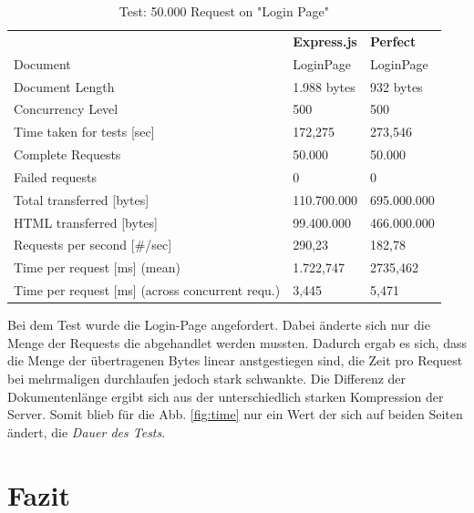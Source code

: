 \begin{table}[H]
\begin{center}
\begin{tabular}{p{8cm}p{2.5cm}p{2.5cm}}
\rowcolor{gray20}														& \textbf{Express.js}	  		& \textbf{Perfect}		\\ 
\rowcolor{gray5}		Document 											& LoginPage					& LoginPage			\\ 
\rowcolor{gray20}	Document Length										& 1.988 bytes				& 932 bytes			\\ 
\rowcolor{gray5}		Concurrency Level									& 500						& 500				\\ 
\rowcolor{gray20}	Time taken for tests [sec]								& 172,275					& 273,546			\\ 
\rowcolor{gray5}		Complete Requests									& 50.000					& 50.000			\\
\rowcolor{gray20}	Failed requests										& 0							& 0					\\ 
\rowcolor{gray5}		Total transferred [bytes]								& 110.700.000				& 695.000.000		\\ 
\rowcolor{gray20}	HTML transferred	[bytes]								& 99.400.000				& 466.000.000		\\ 
\rowcolor{gray5}		Requests per second [\#/sec]							& 290,23					& 182,78			\\ 
\rowcolor{gray20}	Time per request [ms]	 (mean)							& 1.722,747					& 2735,462			\\
\rowcolor{gray5}		Time per request [ms]	 (across concurrent requ.)			& 3,445						& 5,471				\\ 
\end{tabular}
\caption{Test: 50.000 Request on "Login Page"} \label{tab:fiftythousandrequests}
\end{center}
\end{table}

Bei dem Test wurde die Login-Page angefordert. Dabei änderte sich nur die Menge der Requests die abgehandlet werden mussten. Dadurch ergab es sich, dass die Menge der übertragenen Bytes linear anstgestiegen sind, die Zeit pro Request bei mehrmaligen durchlaufen jedoch stark schwankte. Die Differenz der Dokumentenlänge ergibt sich aus der unterschiedlich starken Kompression der Server. Somit blieb für die Abb. \ref{fig:time} nur ein Wert der sich auf beiden Seiten ändert, die \textit{Dauer des Tests}.

\section{Fazit}

